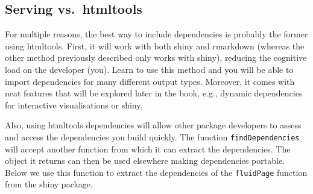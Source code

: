 \documentclass[
]{krantz}
\makeatletter
\newenvironment{Shaded}{\begin{snugshade}}{\end{snugshade}}
\newcommand{\CommentTok}[1]{\textcolor[rgb]{0.37,0.37,0.37}{\textit{#1}}}
\newcommand{\KeywordTok}[1]{\textcolor[rgb]{0.27,0.27,0.27}{\textbf{#1}}}
\newcommand{\NormalTok}[1]{#1}
\newcommand{\OperatorTok}[1]{\textcolor[rgb]{0.43,0.43,0.43}{\textbf{#1}}}
\newenvironment{kframe}{%
\medskip{}
\setlength{\fboxsep}{.8em}
 \def\at@end@of@kframe{}%
 \ifinner\ifhmode%
  \def\at@end@of@kframe{\end{minipage}}%
  \begin{minipage}{\columnwidth}%
 \fi\fi%
 \def\FrameCommand##1{\hskip\@totalleftmargin \hskip-\fboxsep
 \colorbox{shadecolor}{##1}\hskip-\fboxsep
     \hskip-\linewidth \hskip-\@totalleftmargin \hskip\columnwidth}%
 \MakeFramed {\advance\hsize-\width
   \@totalleftmargin\z@ \linewidth\hsize
   \@setminipage}}%
 {\par\unskip\endMakeFramed%
 \at@end@of@kframe}
\renewenvironment{Shaded}{\begin{kframe}}{\end{kframe}}
\makeatother
\begin{document}
\hypertarget{basics-deps-pro-cons}{%
\subsection{Serving vs.~htmltools}\label{basics-deps-pro-cons}}

For multiple reasons, the best way to include dependencies is probably the former using htmltools. First, it will work with both shiny and rmarkdown \citep{R-rmarkdown} (whereas the other method previously described only works with shiny), reducing the cognitive load on the developer (you). Learn to use this method and you will be able to import dependencies for many different output types. Moreover, it comes with neat features that will be explored later in the book, e.g., dynamic dependencies for interactive visualisations or shiny.

Also, using htmltools dependencies will allow other package developers to assess and access the dependencies you build quickly. The function \texttt{findDependencies} will accept another function from which it can extract the dependencies. The object it returns can then be used elsewhere making dependencies portable. Below we use this function to extract the dependencies of the \texttt{fluidPage} function from the shiny package.

\begin{Shaded}
\end{Shaded}
\end{document}
